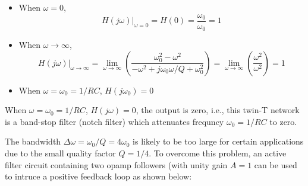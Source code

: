 \begin{itemize}
\item When $\omega=0$, 
  \[
  H(j\omega)\big|_{\omega=0}=H(0)=\frac{\omega_0}{\omega_0}=1
  \]
\item When $\omega\rightarrow \infty$, 
  \[
  H(j\omega)\big|_{\omega\rightarrow\infty}=\lim\limits_{\omega\rightarrow\infty}
  \left( \frac{\omega_0^2-\omega^2}{-\omega^2+j\omega_0\omega/Q+\omega_0^2} \right)
  =\lim\limits_{\omega\rightarrow\infty}\left(\frac{\omega^2}{\omega^2}\right)=1
  \]
\item When $\omega=\omega_0=1/RC$, $H(j\omega_0)=0$
\end{itemize}
When $\omega=\omega_0=1/RC$, $H(j\omega)=0$, the output is zero, i.e.,
this twin-T network is a band-stop filter (notch filter) which attenuates
frequncy $\omega_0=1/RC$ to zero.

The bandwidth $\Delta\omega=\omega_0/Q=4\omega_0$ is likely to be too large 
for certain applications due to the small quality factor $Q=1/4$. To overcome 
this problem, an active filter circuit containing two opamp followers (with
unity gain $A=1$ can be used to intruce a positive feedback loop as shown below:



